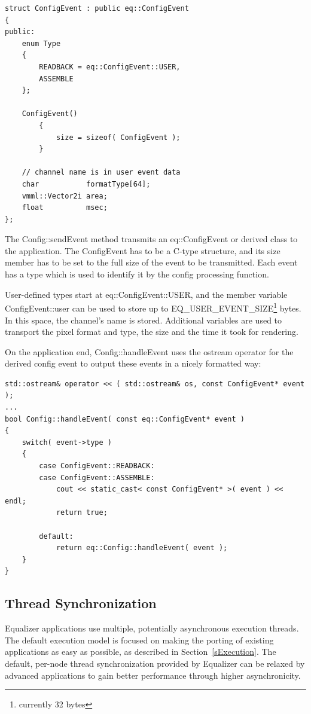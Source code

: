 \documentclass[10pt,a4]{scrartcl}
\newcommand{\sref}[1]{Section~\ref{#1}}
\begin{document}
{\footnotesize\begin{lstlisting}
struct ConfigEvent : public eq::ConfigEvent
{
public:
    enum Type
    {
        READBACK = eq::ConfigEvent::USER,
        ASSEMBLE
    };

    ConfigEvent()
        {
            size = sizeof( ConfigEvent );
        }

    // channel name is in user event data
    char           formatType[64];
    vmml::Vector2i area;
    float          msec;
};
\end{lstlisting}}

The \textsf{Config::sendEvent} method transmits an
\textsf{eq::ConfigEvent} or derived class to the application. The
ConfigEvent has to be a C-type structure, and its \textsf{size}
member has to be set to the full size of the event to be transmitted.
Each event has a type which is used to identify it by the config 
processing function.

User-defined types start at \textsf{eq::ConfigEvent::USER}, and the
member variable \textsf{ConfigEvent::user} can be used to store up to
\textsf{EQ\_USER\_EVENT\_SIZE}\footnote{currently 32 bytes} bytes. In
this space, the channel's name is stored. Additional variables are used
to transport the pixel format and type, the size and the time it took
for rendering.

On the application end, \textsf{Config::handleEvent} uses the
\textsf{ostream} operator for the derived config event to output these
events in a nicely formatted way:

{\footnotesize\begin{lstlisting}
std::ostream& operator << ( std::ostream& os, const ConfigEvent* event );
...
bool Config::handleEvent( const eq::ConfigEvent* event )
{
    switch( event->type )
    {
        case ConfigEvent::READBACK:
        case ConfigEvent::ASSEMBLE:
            cout << static_cast< const ConfigEvent* >( event ) << endl;
            return true;

        default:
            return eq::Config::handleEvent( event );
    }
}
\end{lstlisting}}%


\subsection{\label{sThreads}Thread Synchronization}

Equalizer applications use multiple, potentially asynchronous execution
threads. The default execution model is focused on making the porting of
existing applications as easy as possible, as described in
\sref{sExecution}. The default, per-node thread synchronization provided
by Equalizer can be relaxed by advanced applications to gain better
performance through higher asynchronicity.
\end{document}
